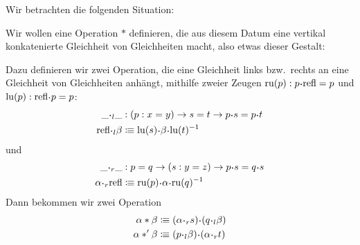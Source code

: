 \begin{beweis}
  Wir betrachten die folgenden Situation:
  \begin{center}
  \end{center}
  Wir wollen eine Operation \(\ast\) definieren, die aus diesem Datum eine vertikal konkatenierte Gleichheit von Gleichheiten macht, also etwas dieser Gestalt:
  \begin{center}
  \end{center}
  Dazu definieren wir zwei Operation, die eine Gleichheit links bzw.\ rechts an eine Gleichheit von Gleichheiten anhängt, mithilfe zweier Zeugen \(\mathrm{ru}(p):p\kon\refl=p\) und \(\mathrm{lu}(p):\refl\kon p=p\):
  \begin{align*}
    \_\kon_l\_ &: (p:x=y)\to s=t \to p\kon s=p\kon t \\
    \refl\kon_l \beta&\colonequiv \mathrm{lu}(s)\kon\beta \kon\mathrm{lu}(t)^{-1}
  \end{align*}
  und 
  \begin{align*}
    \_\kon_r\_ &: p=q\to (s:y=z) \to p\kon s=q\kon s \\
    \alpha\kon_r \refl&\colonequiv \mathrm{ru}(p)\kon\alpha \kon\mathrm{ru}(q)^{-1}
  \end{align*}
  Dann bekommen wir zwei Operation
  \begin{align*}
    \alpha\ast\beta&\colonequiv (\alpha\kon_r s) \kon (q\kon_l\beta) \\
    \alpha\ast^\prime\beta&\colonequiv (p\kon_l\beta)\kon (\alpha\kon_r t)
  \end{align*}
\end{beweis}

